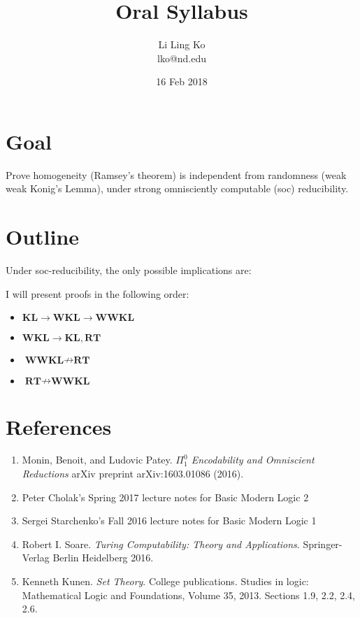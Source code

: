 \documentclass{article}
\begin{document}
\title{Oral Syllabus}
\author{Li Ling Ko\\ lko@nd.edu}
\date{16 Feb 2018}
\maketitle

\section{Goal}
Prove homogeneity (Ramsey's theorem) is independent from randomness (weak
weak Konig's Lemma), under strong omnisciently computable (soc)
reducibility.

\section{Outline}
Under soc-reducibility, the only possible implications are:
\begin{center}
\end{center}

\noindent
I will present proofs in the following order:
\begin{itemize}
  \item $\textbf{KL} \rightarrow \textbf{WKL} \rightarrow \textbf{WWKL}$
  \item $\textbf{WKL} \rightarrow \textbf{KL}, \textbf{RT}$
  \item $\textbf{WWKL} \nrightarrow \textbf{RT}$
  \item $\textbf{RT} \nrightarrow \textbf{WWKL}$
\end{itemize}

\section{References}
\begin{enumerate}
  \item Monin, Benoit, and Ludovic Patey. \textit{$\Pi_1^0$ Encodability and
    Omniscient Reductions} arXiv preprint arXiv:1603.01086 (2016).
  \item Peter Cholak's Spring 2017 lecture notes for Basic Modern Logic 2
  \item Sergei Starchenko's Fall 2016 lecture notes for Basic Modern Logic
    1
  \item Robert I. Soare. \textit{Turing Computability: Theory and
    Applications}. Springer-Verlag Berlin Heidelberg 2016.
  \item Kenneth Kunen. \textit{Set Theory}. College publications. Studies
    in logic: Mathematical Logic and Foundations, Volume 35, 2013. Sections
    1.9, 2.2, 2.4, 2.6.
\end{enumerate}
\end{document}
